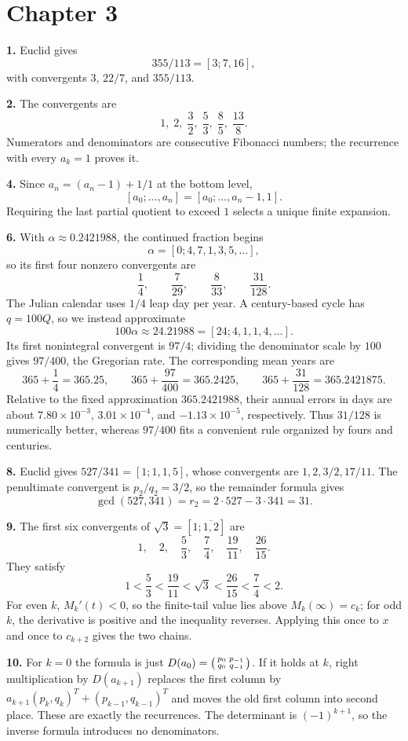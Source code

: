 \section*{Chapter 3}

\textbf{1.} Euclid gives
\[
355/113=[3;7,16],
\]
with convergents $3$, $22/7$, and $355/113$.

\textbf{2.} The convergents are
\[
1,\;2,\;\frac32,\;\frac53,\;\frac85,\;\frac{13}{8}.
\]
Numerators and denominators are consecutive Fibonacci numbers; the recurrence with every $a_k=1$ proves it.

\textbf{4.} Since $a_n=(a_n-1)+1/1$ at the bottom level,
\[
[a_0;\dots,a_n]=[a_0;\dots,a_n-1,1].
\]
Requiring the last partial quotient to exceed $1$ selects a unique finite expansion.

\textbf{6.} With $\alpha\approx0.2421988$, the continued fraction begins
\[
 \alpha=[0;4,7,1,3,5,\dots],
\]
so its first four nonzero convergents are
\[
 \frac14,\qquad\frac7{29},\qquad\frac8{33},\qquad\frac{31}{128}.
\]
The Julian calendar uses $1/4$ leap day per year. A century-based cycle has
$q=100Q$, so we instead approximate
\[
 100\alpha\approx24.21988=[24;4,1,1,4,\dots].
\]
Its first nonintegral convergent is $97/4$; dividing the denominator scale by
$100$ gives $97/400$, the Gregorian rate. The corresponding mean years are
\[
 365+\frac14=365.25,
 \qquad 365+\frac{97}{400}=365.2425,
 \qquad 365+\frac{31}{128}=365.2421875.
\]
Relative to the fixed approximation $365.2421988$, their annual errors in days
are about $7.80\times10^{-3}$, $3.01\times10^{-4}$, and
$-1.13\times10^{-5}$, respectively. Thus $31/128$ is numerically better,
whereas $97/400$ fits a convenient rule organized by fours and centuries.

\textbf{8.} Euclid gives $527/341=[1;1,1,5]$, whose convergents are
$1,2,3/2,17/11$. The penultimate convergent is $p_2/q_2=3/2$, so the
remainder formula gives
\[
  \gcd(527,341)=r_2=2\cdot527-3\cdot341=31.
\]

\textbf{9.} The first six convergents of $\sqrt3=[1;\overline{1,2}]$ are
\[
1,\quad 2,\quad \frac53,\quad \frac74,\quad \frac{19}{11},\quad \frac{26}{15}.
\]
They satisfy
\[
1<\frac53<\frac{19}{11}<\sqrt3
<\frac{26}{15}<\frac74<2.
\]
For even $k$, $M_k'(t)<0$, so the finite-tail value lies above
$M_k(\infty)=c_k$; for odd $k$, the derivative is positive and the inequality
reverses. Applying this once to $x$ and once to $c_{k+2}$ gives the two chains.

\textbf{10.} For $k=0$ the formula is just
$D(a_0)=\begin{psmallmatrix}p_0&p_{-1}\\q_0&q_{-1}\end{psmallmatrix}$.
If it holds at $k$, right multiplication by $D(a_{k+1})$ replaces the first
column by $a_{k+1}(p_k,q_k)^T+(p_{k-1},q_{k-1})^T$ and moves the old first
column into second place. These are exactly the recurrences. The determinant
is $(-1)^{k+1}$, so the inverse formula introduces no denominators.

